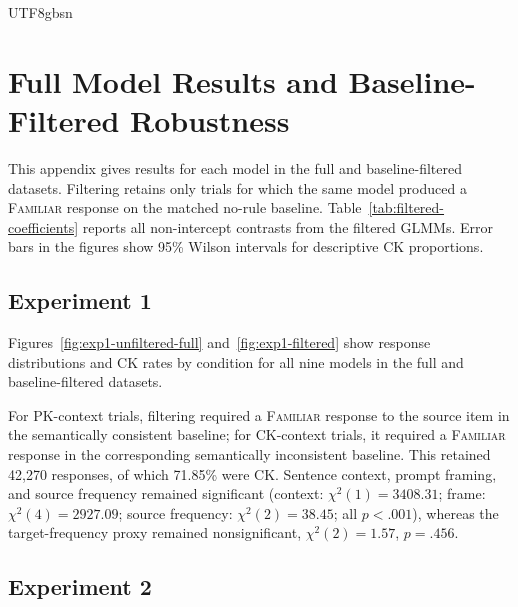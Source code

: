 \documentclass[11pt]{article}
\begin{document}
\begin{CJK*}{UTF8}{gbsn}

\flushbottom
\section{Full Model Results and Baseline-Filtered Robustness}
\label{app:filtered-robustness}

This appendix gives results for each model in the full and baseline-filtered datasets. Filtering retains only trials for which the same model produced a \textsc{Familiar} response on the matched no-rule baseline. Table~\ref{tab:filtered-coefficients} reports all non-intercept contrasts from the filtered GLMMs. Error bars in the figures show 95\% Wilson intervals \citep{wilson1927inference} for descriptive CK proportions.

\subsection{Experiment 1}
\label{app:exp1-full-results}

Figures~\ref{fig:exp1-unfiltered-full} and~\ref{fig:exp1-filtered} show response distributions and CK rates by condition for all nine models in the full and baseline-filtered datasets.

For PK-context trials, filtering required a \textsc{Familiar} response to the source item in the semantically consistent baseline; for CK-context trials, it required a \textsc{Familiar} response in the corresponding semantically inconsistent baseline. This retained 42,270 responses, of which 71.85\% were \textsc{CK}. Sentence context, prompt framing, and source frequency remained significant (context: $\chi^2(1)=3408.31$; frame: $\chi^2(4)=2927.09$; source frequency: $\chi^2(2)=38.45$; all $p<.001$), whereas the target-frequency proxy remained nonsignificant, $\chi^2(2)=1.57$, $p=.456$.

\subsection{Experiment 2}
\label{app:exp2-full-results}


\end{CJK*}
\end{document}
